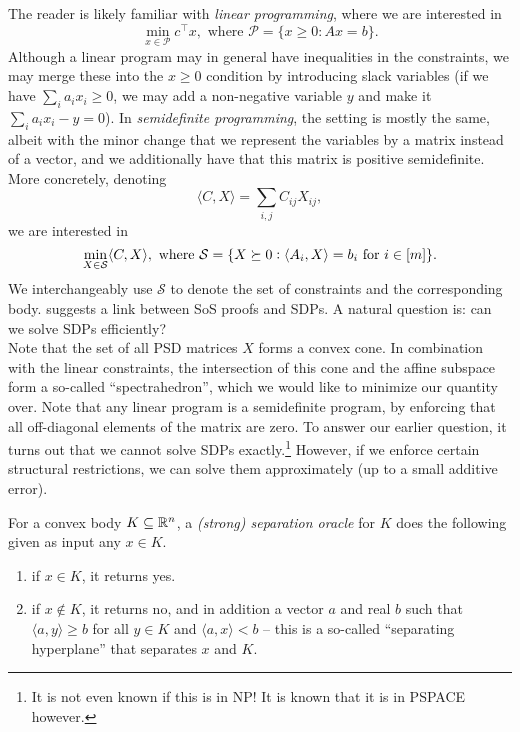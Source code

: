 	The reader is likely familiar with \emph{linear programming}, where we are interested in
	\[ \min_{x \in \mathcal{P}} c^\top x, \text{ where } \mathcal{P} = \{ x \ge 0 : Ax = b \}. \]
	Although a linear program may in general have inequalities in the constraints, we may merge these into the $x \ge 0$ condition by introducing slack variables (if we have $\sum_i a_i x_i \ge 0$, we may add a non-negative variable $y$ and make it $\sum_i a_i x_i - y = 0$). In \emph{semidefinite programming}, the setting is mostly the same, albeit with the minor change that we represent the variables by a matrix instead of a vector, and we additionally have that this matrix is positive semidefinite. More concretely, denoting
	\[ \langle C,X\rangle = \sum_{i,j} C_{ij} X_{ij}, \]
	we are interested in
	\[ \min_{X \in \mathcal{S}} \langle C,X\rangle, \text{ where } \mathcal{S} = \{ X \succeq 0 : \langle A_i,X\rangle = b_i \text{ for $i \in [m]$} \}. \]
	We interchangeably use $\mathcal{S}$ to denote the set of constraints and the corresponding body.
	 suggests a link between SoS proofs and SDPs. A natural question is: can we solve SDPs efficiently?\\
	Note that the set of all PSD matrices $X$ forms a convex cone. In combination with the linear constraints, the intersection of this cone and the affine subspace form a so-called ``spectrahedron'', which we would like to minimize our quantity over. Note that any linear program is a semidefinite program, by enforcing that all off-diagonal elements of the matrix are zero. To answer our earlier question, it turns out that we cannot solve SDPs exactly.\footnote{It is not even known if this is in \textsf{NP}! It is known that it is in \textsf{PSPACE} however.} However, if we enforce certain structural restrictions, we can solve them approximately (up to a small additive error).

	\begin{fdef}
		For a convex body $K \subseteq \mathbb{R}^n$, a \emph{(strong) separation oracle} for $K$ does the following given as input any $x \in K$.
		\begin{enumerate}
			\item if $x \in K$, it returns \textsf{yes}.
			\item if $x \not\in K$, it returns \textsf{no}, and in addition a vector $a$ and real $b$ such that $\langle a,y\rangle \ge b$ for all $y \in K$ and $\langle a,x\rangle < b$  -- this is a so-called ``separating hyperplane'' that separates $x$ and $K$.
		\end{enumerate}
	\end{fdef}

